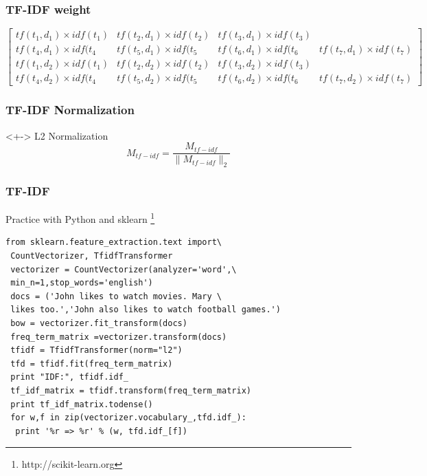 \documentclass[serif,11pt,aspectratio=1610,table]{beamer}
\begin{document}
\begin{frame}[fragile]
 \frametitle{TF-IDF weight}
\footnotesize
\begin{displaymath}
 \begin{bmatrix}
  tf(t_{1},d_{1}) \times idf(t_{1}) & tf(t_{2},d_{1}) \times idf(t_{2}) & tf(t_{3},d_{1}) \times idf(t_{3}) & \\
tf(t_{4},d_{1}) \times idf(t_{4} & tf(t_{5},d_{1}) \times idf(t_{5} & tf(t_{6},d_{1}) \times idf(t_{6} & tf(t_{7},d_{1}) \times idf(t_{7}) \\
 tf(t_{1},d_{2}) \times idf(t_{1}) & tf(t_{2},d_{2}) \times idf(t_{2}) & tf(t_{3},d_{2}) \times idf(t_{3}) & \\
tf(t_{4},d_{2}) \times idf(t_{4} & tf(t_{5},d_{2}) \times idf(t_{5} & tf(t_{6},d_{2}) \times idf(t_{6} & tf(t_{7},d_{2}) \times idf(t_{7})
 \end{bmatrix}
\end{displaymath}

\end{frame}


\begin{frame}[fragile]
 \frametitle{TF-IDF Normalization}
  \begin{block}<+-> { L2 Normalization }
  \begin{displaymath}
  M_{tf-idf} = \frac{M_{tf-idf}}{\|M_{tf-idf}\| _{2}}
  \end{displaymath}

  \end{block}

\end{frame}

\begin{frame}[fragile]
 \frametitle{TF-IDF}
Practice with Python and sklearn \footnote{http://scikit-learn.org}
\footnotesize
\begin{Verbatim}[frame=single]
 from sklearn.feature_extraction.text import\
 CountVectorizer, TfidfTransformer
 vectorizer = CountVectorizer(analyzer='word',\
 min_n=1,stop_words='english')
 docs = ('John likes to watch movies. Mary \
 likes too.','John also likes to watch football games.')
 bow = vectorizer.fit_transform(docs)
 freq_term_matrix =vectorizer.transform(docs)
 tfidf = TfidfTransformer(norm="l2")
 tfd = tfidf.fit(freq_term_matrix)
 print "IDF:", tfidf.idf_
 tf_idf_matrix = tfidf.transform(freq_term_matrix)
 print tf_idf_matrix.todense()
 for w,f in zip(vectorizer.vocabulary_,tfd.idf_):
  print '%r => %r' % (w, tfd.idf_[f])
\end{Verbatim}

\end{frame}
\end{document}

